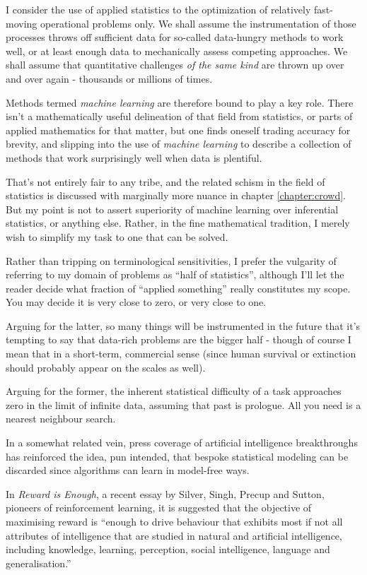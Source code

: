 I consider the use of applied statistics to the optimization of relatively fast-moving operational problems only. We shall assume the instrumentation of those processes throws off sufficient data for so-called data-hungry methods to work well, or at least enough data to mechanically assess competing approaches. We shall assume that quantitative challenges {\em of the same kind} are thrown up over and over again - thousands or millions of times. 

Methods termed {\em machine learning} are therefore bound to play a key role. There isn't a mathematically useful delineation of that field from statistics, or parts of applied mathematics for that matter, but one finds oneself trading accuracy for brevity, and slipping into the use of {\em machine learning} to describe a collection of methods that work surprisingly well when data is plentiful. 

That's not entirely fair to any tribe, and the related schism in the field of statistics is discussed with marginally more nuance in chapter \ref{chapter:crowd}. But my point is not to assert superiority of machine learning over inferential statistics, or anything else. Rather, in the fine mathematical tradition, I merely wish to simplify my task to one that can be solved. 

Rather than tripping on terminological sensitivities, I prefer the vulgarity of referring to my domain of problems as ``half of statistics'', although I'll let the reader decide what fraction of ``applied something'' really constitutes my scope. You may decide it is very close to zero, or very close to one. 

Arguing for the latter, so many things will be instrumented in the future that it's tempting to say that data-rich problems are the bigger half - though of course I mean that in a short-term, commercial sense (since human survival or extinction should probably appear on the scales as well).  

Arguing for the former, the inherent statistical difficulty of a task approaches zero in the limit of infinite data, assuming that past is prologue. All you need is a nearest neighbour search. 

In a somewhat related vein, press coverage of artificial intelligence breakthroughs has reinforced the idea, pun intended, that bespoke statistical modeling can be discarded since algorithms can learn in model-free ways. 

In {\em Reward is Enough}, a recent essay by Silver, Singh, Precup and Sutton, pioneers of reinforcement learning,  it is suggested that the objective of maximising reward is ``enough to drive behaviour that exhibits most if not all attributes of intelligence that are studied in natural and artificial intelligence, including knowledge, learning, perception, social intelligence, language and generalisation.'' 

